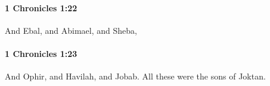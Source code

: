 		\paragraph{1 Chronicles 1:22} %
			\label{1CHRONICLES-1-22}

			And Ebal, and Abimael, and Sheba,


		\paragraph{1 Chronicles 1:23} %
			\label{1CHRONICLES-1-23}

			And Ophir, and Havilah, and Jobab. All these were the sons of Joktan.


